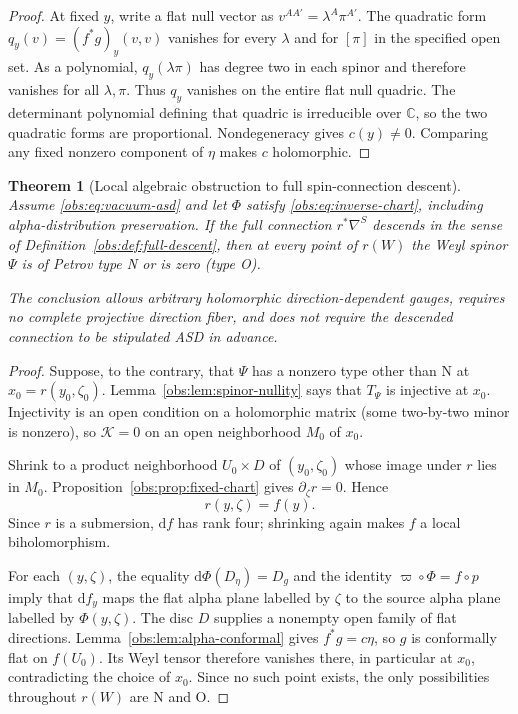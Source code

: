 \documentclass[11pt]{article}
\newtheorem{theorem}{Theorem}[section]
\theoremstyle{definition}
\theoremstyle{remark}
\newcommand{\C}{\mathbb C}
\newcommand{\dd}{\mathrm d}
\begin{document}
\begin{proof}
At fixed $y$, write a flat null vector as $v^{AA'}=\lambda^A\pi^{A'}$.
The quadratic form $q_y(v)=(f^*g)_y(v,v)$ vanishes for every $\lambda$ and
for $[\pi]$ in the specified open set. As a polynomial, $q_y(\lambda\pi)$
has degree two in each spinor and therefore vanishes for all $\lambda,\pi$.
Thus $q_y$ vanishes on the entire flat null quadric. The determinant
polynomial defining that quadric is irreducible over $\C$, so the two
quadratic forms are proportional. Nondegeneracy gives $c(y)\ne0$.
Comparing any fixed nonzero component of $\eta$ makes $c$ holomorphic.
\end{proof}

\begin{theorem}[Local algebraic obstruction to full spin-connection descent]
\label{obs:thm:petrov-obstruction}
Assume \eqref{obs:eq:vacuum-asd} and let $\Phi$ satisfy
\eqref{obs:eq:inverse-chart}, including alpha-distribution preservation.
If the full connection $r^*\nabla^S$ descends in the sense of
Definition~\ref{obs:def:full-descent}, then at every point of $r(W)$ the
Weyl spinor $\Psi$ is of Petrov type N or is zero (type O).

The conclusion allows arbitrary holomorphic direction-dependent gauges,
requires no complete projective direction fiber, and does not require the
descended connection to be stipulated ASD in advance.
\end{theorem}

\begin{proof}
Suppose, to the contrary, that $\Psi$ has a nonzero type other than N at
$x_0=r(y_0,\zeta_0)$. Lemma~\ref{obs:lem:spinor-nullity} says that
$T_\Psi$ is injective at $x_0$. Injectivity is an open condition on a
holomorphic matrix (some two-by-two minor is nonzero), so
$\mathcal K=0$ on an open neighborhood $M_0$ of $x_0$.

Shrink to a product neighborhood $U_0\times D$ of $(y_0,\zeta_0)$ whose
image under $r$ lies in $M_0$. Proposition~\ref{obs:prop:fixed-chart} gives
$\partial_\zeta r=0$. Hence
\[
 r(y,\zeta)=f(y).
\]
Since $r$ is a submersion, $\dd f$ has rank four; shrinking again makes
$f$ a local biholomorphism.

For each $(y,\zeta)$, the equality
$\dd\Phi(D_\eta)=D_g$ and the identity $\varpi\circ\Phi=f\circ p$
imply that $\dd f_y$ maps the flat alpha plane labelled by $\zeta$ to the
source alpha plane labelled by $\Phi(y,\zeta)$. The disc $D$ supplies a
nonempty open family of flat directions. Lemma~\ref{obs:lem:alpha-conformal}
gives $f^*g=c\eta$, so $g$ is conformally flat on $f(U_0)$.
Its Weyl tensor therefore vanishes there, in particular at $x_0$,
contradicting the choice of $x_0$. Since no such point exists, the only
possibilities throughout $r(W)$ are N and O.
\end{proof}
\end{document}
